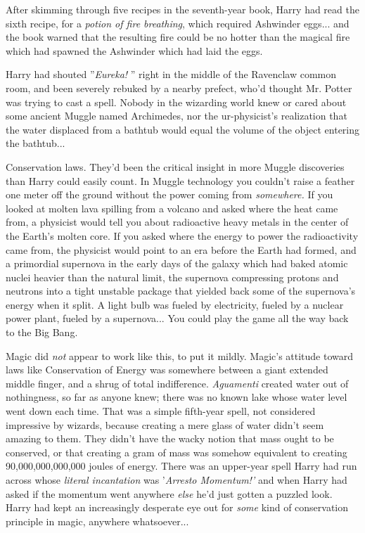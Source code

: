 After skimming through five recipes in the seventh-year book, Harry had
read the sixth recipe, for a \emph{potion of fire breathing}, which
required Ashwinder eggs... and the book warned that the resulting
fire could be no hotter than the magical fire which had spawned the
Ashwinder which had laid the eggs.

Harry had shouted ''\emph{Eureka!} '' right in the middle of the Ravenclaw
common room, and been severely rebuked by a nearby prefect, who'd
thought Mr. Potter was trying to cast a spell. Nobody in the wizarding
world knew or cared about some ancient Muggle named Archimedes, nor the
ur-physicist's realization that the water displaced from a bathtub would
equal the volume of the object entering the bathtub...

Conservation laws. They'd been the critical insight in more Muggle
discoveries than Harry could easily count. In Muggle technology you
couldn't raise a feather one meter off the ground without the power
coming from \emph{somewhere.} If you looked at molten lava spilling from
a volcano and asked where the heat came from, a physicist would tell you
about radioactive heavy metals in the center of the Earth's molten core.
If you asked where the energy to power the radioactivity came from, the
physicist would point to an era before the Earth had formed, and a
primordial supernova in the early days of the galaxy which had baked
atomic nuclei heavier than the natural limit, the supernova compressing
protons and neutrons into a tight unstable package that yielded back
some of the supernova's energy when it split. A light bulb was fueled by
electricity, fueled by a nuclear power plant, fueled by a
supernova... You could play the game all the way back to the Big
Bang.

Magic did \emph{not} appear to work like this, to put it mildly. Magic's
attitude toward laws like Conservation of Energy was somewhere between a
giant extended middle finger, and a shrug of total indifference.
\emph{Aguamenti} created water out of nothingness, so far as anyone
knew; there was no known lake whose water level went down each time.
That was a simple fifth-year spell, not considered impressive by
wizards, because creating a mere glass of water didn't seem amazing to
them. They didn't have the wacky notion that mass ought to be conserved,
or that creating a gram of mass was somehow equivalent to creating
90,000,000,000,000 joules of energy. There was an upper-year spell Harry
had run across whose \emph{literal incantation} was '\emph{Arresto
Momentum!'} and when Harry had asked if the momentum went anywhere
\emph{else} he'd just gotten a puzzled look. Harry had kept an
increasingly desperate eye out for \emph{some} kind of conservation
principle in magic, anywhere whatsoever...

